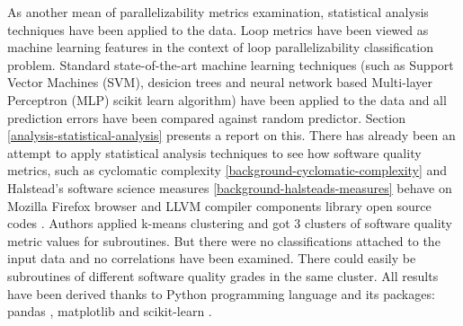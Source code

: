 \null\qquad As another mean of parallelizability metrics examination, statistical analysis techniques have been applied to the data. Loop metrics have been viewed as machine learning features in the context of loop parallelizability classification problem. Standard state-of-the-art  machine learning techniques (such as Support Vector Machines (SVM), desicion trees and neural network based Multi-layer Perceptron (MLP) scikit learn algorithm) have been applied to the data and all prediction errors have been compared against random predictor. Section \ref{analysis-statistical-analysis} presents a report on this.\newline
\null\qquad There has already been an attempt to apply statistical analysis techniques to see how software quality metrics, such as cyclomatic complexity \ref{background-cyclomatic-complexity} and Halstead's software science measures \ref{background-halsteads-measures} behave on Mozilla Firefox browser and LLVM compiler components library open source codes \cite{source-code-quality-classification-paper}. Authors applied k-means clustering and got 3 clusters of software quality metric values for subroutines. But there were no classifications attached to the input data and no correlations have been examined. There could easily be subroutines of different software quality grades in the same cluster. \newline
\null\qquad All results have been derived thanks to Python programming language and its packages: pandas \cite{python-lib-pandas}, matplotlib \cite{python-matplotlib} and scikit-learn \cite{python-lib-scikit-learn}. 

